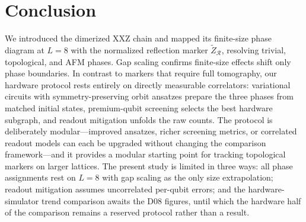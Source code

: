\section{Conclusion}
\label{sec:conclusion}

We introduced the dimerized XXZ chain and mapped its finite-size phase
diagram at $L=8$ with the normalized reflection marker
$\tilde{Z}_{\mathcal R}$, resolving trivial, topological, and AFM phases.
Gap scaling confirms finite-size effects shift only phase boundaries.
In contrast to markers that require full tomography, our hardware
protocol rests entirely on directly measurable correlators: variational
circuits with symmetry-preserving orbit ansatzes prepare the three
phases from matched initial states, premium-qubit screening selects the
best hardware subgraph, and readout mitigation unfolds the raw counts.
The protocol is deliberately modular---improved ansatzes, richer
screening metrics, or correlated readout models can each be upgraded
without changing the comparison framework---and it provides a modular
starting point for tracking topological markers on larger lattices.
The present study is limited in three ways: all phase assignments rest
on $L=8$ with gap scaling as the only size extrapolation; readout
mitigation assumes uncorrelated per-qubit errors; and the
hardware-simulator trend comparison awaits the D08 figures, until which
the hardware half of the comparison remains a reserved protocol rather
than a result.
